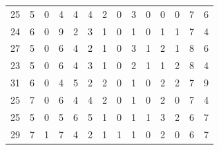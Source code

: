 \begin{table}[]
\begin{tabular}{rrrrrrrrrrrrrr}
		25 & 5 & 0 & 4 & 4 & 4 & 2 & 0 & 3 & 0 & 0 & 0 & 7 & 6 \\
		24 & 6 & 0 & 9 & 2 & 3 & 1 & 0 & 1 & 0 & 1 & 1 & 7 & 4 \\
		27 & 5 & 0 & 6 & 4 & 2 & 1 & 0 & 3 & 1 & 2 & 1 & 8 & 6 \\
		23 & 5 & 0 & 6 & 4 & 3 & 1 & 0 & 2 & 1 & 1 & 2 & 8 & 4 \\
		31 & 6 & 0 & 4 & 5 & 2 & 2 & 0 & 1 & 0 & 2 & 2 & 7 & 9 \\
		25 & 7 & 0 & 6 & 4 & 4 & 2 & 0 & 1 & 0 & 2 & 0 & 7 & 4 \\
		25 & 5 & 0 & 5 & 6 & 5 & 1 & 0 & 1 & 1 & 3 & 2 & 6 & 7 \\
		29 & 7 & 1 & 7 & 4 & 2 & 1 & 1 & 1 & 0 & 2 & 0 & 6 & 7
	\end{tabular}
\end{table}

